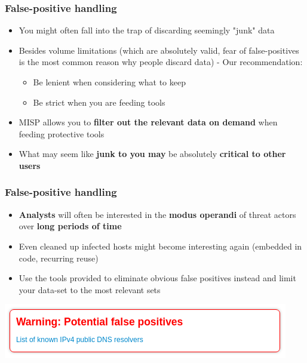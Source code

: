 \begin{frame}
\frametitle{False-positive handling}
\begin{itemize}
	\item You might often fall into the trap of discarding seemingly "junk" data
	\item Besides volume limitations (which are absolutely valid, fear of false-positives is the most common reason why people discard data) - Our recommendation:
	\begin{itemize}
		\item Be lenient when considering what to keep
		\item Be strict when you are feeding tools
	\end{itemize}
\item MISP allows you to {\bf filter out the relevant data on demand} when feeding protective tools
\item What may seem like {\bf junk to you may} be absolutely {\bf critical to other users}
\end{itemize}
\end{frame}

\begin{frame}
\frametitle{False-positive handling}
\begin{itemize}
    \item {\bf Analysts} will often be interested in the {\bf modus operandi} of threat actors over {\bf long periods of time}
	\item Even cleaned up infected hosts might become interesting again (embedded in code, recurring reuse)
	\item Use the tools provided to eliminate obvious false positives instead and limit your data-set to the most relevant sets
\end{itemize}
\includegraphics[scale=0.8]{screenshots/false-positive.png}
\end{frame}



